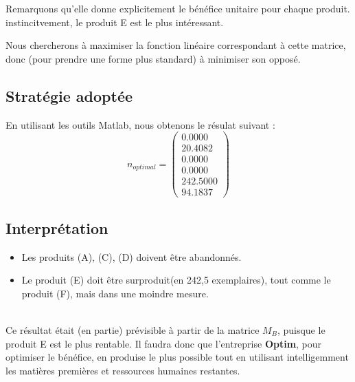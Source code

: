 Remarquons qu'elle donne explicitement le bénéfice unitaire pour chaque produit. instincitvement, le produit E est 
le plus intéressant.

Nous chercherons à maximiser la fonction linéaire correspondant à cette matrice, donc (pour prendre une forme plus standard)
à minimiser son opposé.

\subsection{Stratégie adoptée}

En utilisant les outils Matlab, nous obtenons le résulat suivant :
\[
	n_{optimal} = 
\begin{pmatrix}
    0.0000 \\
   20.4082 \\
    0.0000 \\
    0.0000 \\
  242.5000 \\
   94.1837
\end{pmatrix}
\]
\begin{center}
\end{center}

\subsection{Interprétation}
\begin{itemize}
	\item Les produits (A), (C), (D) doivent être abandonnés.
	\item Le produit (E) doit être \og surproduit\fg (en 242,5 exemplaires), tout comme le produit (F), mais dans 
	une moindre mesure.
\end{itemize}
~\\
Ce résultat était (en partie) prévisible à partir de la matrice $M_{B}$, puisque le produit E est le plus rentable.
Il faudra donc que l'entreprise \textbf{Optim}, pour optimiser le bénéfice, en produise le plus possible tout en 
utilisant intelligemment les matières premières et ressources humaines restantes.
